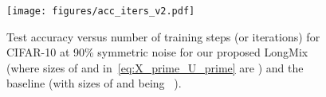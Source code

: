 \documentclass[review]{elsarticle}
\begin{document}
\begin{figure}[t]
\centering
\texttt{[image: figures/acc\_iters\_v2.pdf]}
\caption{Test accuracy versus number of training steps (or iterations) for CIFAR-10 at 90\% symmetric noise for our proposed LongMix (where sizes of  and  in~\eqref{eq:X_prime_U_prime} are ) and the baseline (with sizes of  and  being ~\cite{li2020dividemix}).
}
\label{fig:acc_iters}
\end{figure}


\begin{table}[ht]
\centering
\footnotesize
{}
\end{table}
\end{document}
